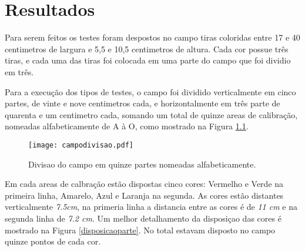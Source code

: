 \chapter{Resultados} 


	Para serem feitos os testes foram despostos no campo tiras coloridas entre 17 e 40 centimetros de largura e  5,5 e 10,5 centimetros de altura. Cada cor possue três tiras, e cada uma das tiras foi colocada em uma parte do campo que foi dividio em três.


Para a execução dos tipos de testes, o campo foi dividido verticalmente em cinco partes, de vinte e nove centimetros cada, e horizontalmente em três parte de quarenta e um centimetro cada, somando um total de quinze areas de calibração, nomeadas alfabeticamente de A à O, como mostrado na Figura \ref{campodivisao}.

\begin{figure}[!: h]
		\centering
		\texttt{[image: campodivisao.pdf]}
		\caption{Divisao do campo em quinze partes nomeadas alfabeticamente.}
		\label{campodivisao}
	\end{figure}
	
Em cada areas de calbração estão dispostas cinco cores: Vermelho  e Verde na primeira linha, Amarelo, Azul e Laranja na segunda. As cores estão distantes verticalmente \textit{7.5cm}, na primeria linha a distancia entre as cores é  de \textit{11 cm} e na segunda linha de \textit{7.2 cm}. Um  melhor detalhamento da disposiçao das cores é  mostrado na Figura \ref{disposicaoparte}. No total estavam disposto no campo quinze pontos de cada cor.



